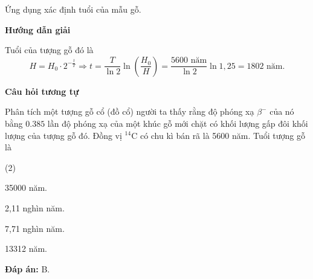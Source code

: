 \begin{dang}{Ứng dụng xác định tuổi của mẫu gỗ.}
	
	
	{\begin{center}
			\textbf{Hướng dẫn giải}
		\end{center}
		
		Tuổi của tượng gỗ đó là
		\begin{equation*}
			H=H_0\cdot 2^{-\frac{t}{T}}\Rightarrow t=\dfrac{T}{\ln2}\ln \left(\dfrac{H_0}{H}\right)=\dfrac{\textrm{5600 năm}}{\ln2}\ln 1,25=\textrm{1802 năm}.
		\end{equation*}
		
		\begin{center}
			\textbf{Câu hỏi tương tự}
		\end{center}
		
		Phân tích một tượng gỗ cổ (đồ cổ) người ta thấy rằng độ phóng xạ $ \beta^{-} $ của nó bằng $ \num{0,385} $ lần độ phóng xạ của một khúc gỗ mới chặt có khối lượng gấp đôi khối lượng của tượng gỗ đó. Đồng vị $ ^{14} \text{C} $ có chu kì bán rã là 5600 năm. Tuổi tượng gỗ là
		\begin{mcq}(2)
			\item 35000 năm.
			\item 2,11 nghìn năm.
			\item 7,71 nghìn năm.
			\item 13312 năm.
		\end{mcq}	
		
		\textbf{Đáp án:} B.}
\end{dang}


